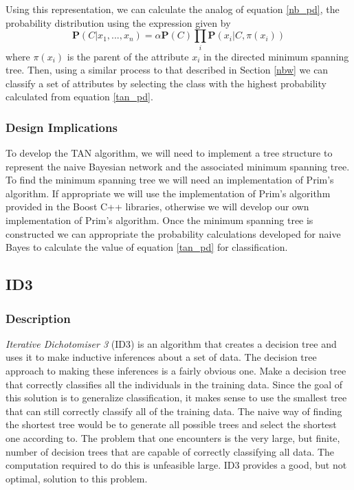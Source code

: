 \documentclass{article}
\newcommand{\ve}[1]{\boldsymbol{\mathbf{#1}}}
\begin{document}
				Using this representation, we can calculate the analog of equation \ref{nb_pd}, the probability distribution using the expression given by \cite{Zheng2010}
				\begin{equation}
						\ve{P}(C|x_1,...,x_n) = \alpha \ve{P}(C) \prod_i \ve{P}(x_i| C, \pi(x_i)) \label{tan_pd}
				\end{equation}
				where $\pi(x_i)$ is the parent of the attribute $x_i$ in the directed minimum spanning tree. 
				Then, using a similar process to that described in Section \ref{nbw} we can classify a set of attributes by selecting the class with the highest probability calculated from equation \ref{tan_pd}.
			\subsubsection{Design Implications}
				To develop the TAN algorithm, we will need to implement a tree structure to represent the naive Bayesian network and the associated minimum spanning tree. 
				To find the minimum spanning tree we will need an implementation of Prim's algorithm.
				If appropriate we will use the implementation of Prim's algorithm provided in the Boost C++ libraries, otherwise we will develop our own implementation of Prim's algorithm. 
				Once the minimum spanning tree is constructed we can appropriate the probability calculations developed for naive Bayes to calculate the value of equation \ref{tan_pd} for classification.
		\subsection{ID3}
			\subsubsection{Description}
				\textit{Iterative Dichotomiser 3} (ID3) is an algorithm that creates a decision tree and uses it to make inductive inferences about a set of data.
				The decision tree approach to making these inferences is a fairly obvious one.
				Make a decision tree that correctly classifies all the individuals in the training data.
				Since the goal of this solution is to generalize classification, it makes sense to use the smallest tree that can still correctly classify all of the training data.
				The naive way of finding the shortest tree would be to generate all possible trees and select the shortest one according to\cite{Quinlan1986}.
				The problem that one encounters is the very large, but finite, number of decision trees that are capable of correctly classifying all data.
				The computation required to do this is unfeasible large.
				ID3 provides a good, but not optimal, solution to this problem.
		
\end{document}
